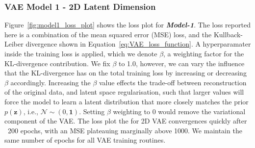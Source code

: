 \documentclass{article}
\begin{document}
\subsubsection{VAE Model 1 - 2D Latent Dimension}

Figure~\ref{fig:model1_loss_plot} shows the loss plot for \textbf{\textit{Model-1}}. The loss reported here is a combination of the mean squared error (MSE) loss, and the Kullback-Leiber divergence shown in Equation~\ref{eq:VAE_loss_function}. A hyperparamater inside the training loss is applied, which we denote $\beta$, a weighting factor for the KL-divergence contribution. We fix $\beta$ to 1.0, however, we can vary the influence that the KL-divergence has on the total training loss by increasing or decreasing $\beta$ accordingly. Increasing the $\beta$ value effects the trade-off between reconstruction of the original data, and latent space regularisation, such that larger values will force the model to learn a latent distribution that more closely matches the prior $p(\textbf{z})$, i.e., $\mathcal{N}\sim(0,\textbf{1})$. Setting $\beta$ weighting to 0 would remove the variational component of the VAE. The loss plot the for 2D VAE convergences quickly after ~200 epochs, with an MSE plateauing marginally above 1000. We maintain the same number of epochs for all VAE training routines.
\end{document}

